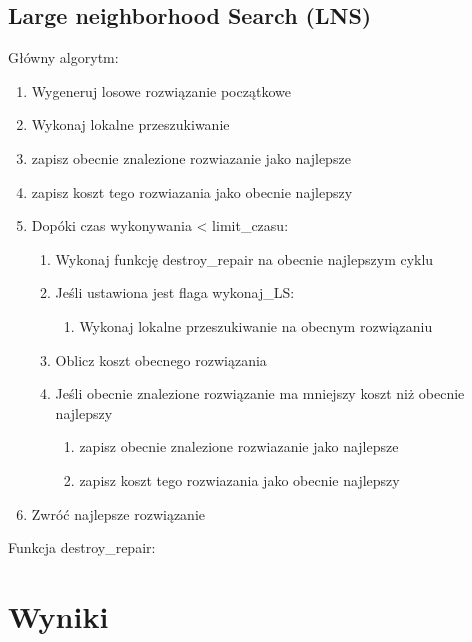 \documentclass[11pt]{article}
\begin{document}
\subsection{Large neighborhood Search (LNS)}\label{subsec:lns}


Główny algorytm:
\begin{enumerate}
    \item Wygeneruj losowe rozwiązanie początkowe
    \item Wykonaj lokalne przeszukiwanie
    \item zapisz obecnie znalezione rozwiazanie jako najlepsze
    \item zapisz koszt tego rozwiazania jako obecnie najlepszy
    \item Dopóki czas wykonywania < limit\_czasu:
        \begin{enumerate}
            \item Wykonaj funkcję destroy\_repair na obecnie najlepszym cyklu
            \item Jeśli ustawiona jest flaga wykonaj\_LS:
            \begin{enumerate}
                \item Wykonaj lokalne przeszukiwanie na obecnym rozwiązaniu
            \end{enumerate}
            \item Oblicz koszt obecnego rozwiązania
            \item Jeśli obecnie znalezione rozwiązanie ma mniejszy koszt niż obecnie najlepszy
                \begin{enumerate}
                    \item zapisz obecnie znalezione rozwiazanie jako najlepsze
                    \item zapisz koszt tego rozwiazania jako obecnie najlepszy
                \end{enumerate}
        \end{enumerate}
    \item Zwróć najlepsze rozwiązanie
\end{enumerate}


Funkcja destroy\_repair:
\begin{enumerate}

\end{enumerate}


\section{Wyniki}\label{sec:wyniki}
\end{document}
